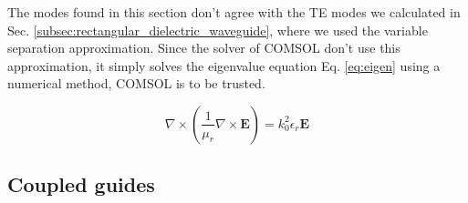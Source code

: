 \documentclass[a4paper,12pt]{article}
\begin{document}
The modes found in this section don't agree with the TE modes we calculated in Sec. \ref{subsec:rectangular_dielectric_waveguide}, where we used the variable separation approximation. Since the solver of COMSOL don't use this approximation, it simply solves the eigenvalue equation Eq. \ref{eq:eigen} using a numerical method, COMSOL is to be trusted.

\begin{equation}
    \nabla \times \left( \frac{1}{\mu_r} \nabla \times \mathbf{E} \right) = k_0^2 \epsilon_r \mathbf{E}
    \label{eq:eigen}
\end{equation}

\subsection{Coupled guides}
\label{subsec:coupled_guides}
\end{document}
